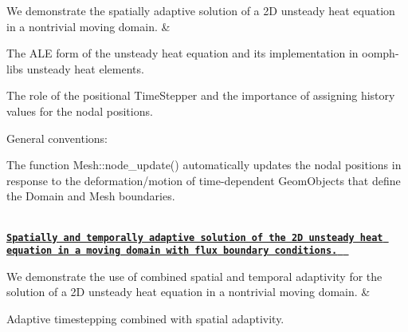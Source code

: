 \begin{longtabu}
We demonstrate the spatially adaptive solution of a 2D unsteady heat equation in a nontrivial moving domain.  &
\begin{DoxyItemize}
\item The A\+LE form of the unsteady heat equation and its implementation in {\ttfamily oomph-\/lib\textquotesingle{}s} unsteady heat elements.
\item The role of the positional {\ttfamily Time\+Stepper} and the importance of assigning history values for the nodal positions.
\item General conventions\+:
\begin{DoxyItemize}
\item The function {\ttfamily Mesh\+::node\+\_\+update()} automatically updates the nodal positions in response to the deformation/motion of time-\/dependent {\ttfamily Geom\+Objects} that define the {\ttfamily Domain} and {\ttfamily Mesh} boundaries. 
\end{DoxyItemize}
\end{DoxyItemize}

\\
\href{../../unsteady_heat/two_d_unsteady_heat_2adapt/html/index.html}{\tt {\bfseries  Spatially and temporally adaptive solution of the 2D unsteady heat equation in a moving domain with flux boundary conditions. } }

We demonstrate the use of combined spatial and temporal adaptivity for the solution of a 2D unsteady heat equation in a nontrivial moving domain.  &
\begin{DoxyItemize}
\item Adaptive timestepping combined with spatial adaptivity. 
\end{DoxyItemize}



\\
\end{longtabu}
\tabulinesep=1mm
